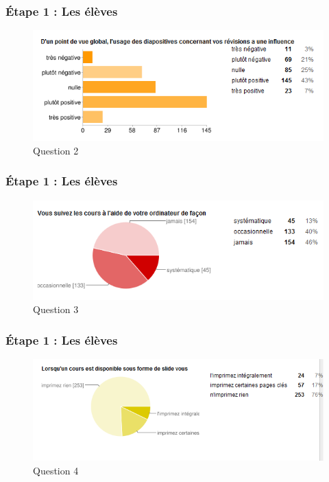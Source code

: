 \documentclass[slidetop,11pt]{beamer}
\begin{document}
\begin{frame} 
  \frametitle{\'Etape 1 : Les élèves}
  \begin{figure}[h!]
  \includegraphics[width=\textwidth]{i2.PNG}
  \caption{Question 2}
  \label{i2}
  \end{figure}
\end{frame}

\begin{frame} 
  \frametitle{\'Etape 1 : Les élèves}
  \begin{figure}[h!]
  \includegraphics[width=\textwidth]{i3.PNG}
  \caption{Question 3}
  \label{i3}
  \end{figure}
\end{frame}

\begin{frame} 
  \frametitle{\'Etape 1 : Les élèves}
  \begin{figure}[h!]
  \includegraphics[width=\textwidth]{i4.PNG}
  \caption{Question 4}
  \label{i4}
  \end{figure}
\end{frame}
\end{document}
